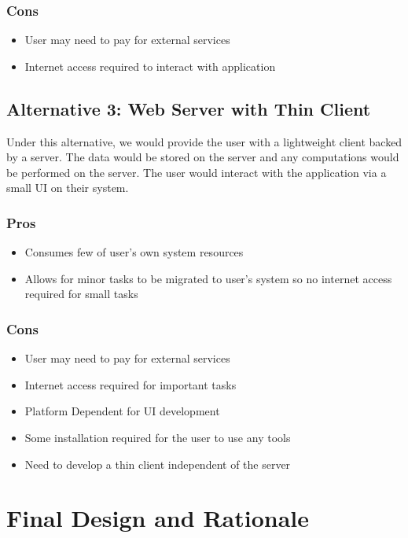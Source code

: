 \documentclass[12pt,a4paper]{article}
\begin{document}
\subsubsection{Cons}
\begin{itemize}
\item User may need to pay for external services
\item Internet access required to interact with application
\end{itemize}

\subsection{Alternative 3: Web Server with Thin Client}

Under this alternative, we would provide the user with a lightweight client backed by a server. The data would be stored on the server and any computations would be performed on the server. The user would interact with the application via a small UI on their system.

\subsubsection{Pros}
\begin{itemize}
\item Consumes few of user's own system resources
\item Allows for minor tasks to be migrated to user's system so no internet access required for small tasks
\end{itemize}
\subsubsection{Cons}
\begin{itemize}
\item User may need to pay for external services
\item Internet access required for important tasks
\item Platform Dependent for UI development
\item Some installation required for the user to use any tools
\item Need to develop a thin client independent of the server
\end{itemize}
\newpage
\section{Final Design and Rationale}
\end{document}
